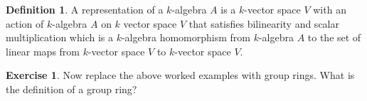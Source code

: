 \documentclass[10pt]{article}
\theoremstyle{plain}%
\theoremstyle{definition}
\newtheorem{definition}{Definition}[section]
\newtheorem{exercise}{Exercise}[section]
\theoremstyle{remark}
\begin{document}
\begin{definition}
	A representation of a $k$-algebra $A$ is a $k$-vector space $V$ with an action of $k$-algebra $A$ on $k$ vector space $V$ that satisfies bilinearity and scalar multiplication which is a $k$-algebra homomorphism from $k$-algebra $A$ to the set of linear maps from $k$-vector space $V$ to $k$-vector space $V$.
\end{definition}

\begin{exercise}
	Now replace the above worked examples with group rings. What is the definition of a group ring?
\end{exercise}
\end{document}
